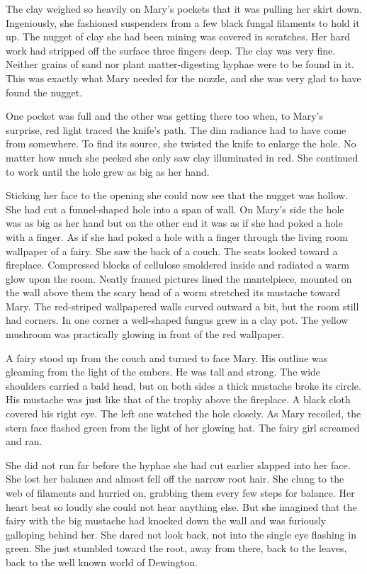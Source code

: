 \documentclass[10pt, draft]{memoir}
\begin{document}
The clay weighed so heavily on Mary's pockets that it was pulling her skirt down. Ingeniously, she fashioned suspenders from a few black fungal filaments to hold it up. The nugget of clay she had been mining was covered in scratches. Her hard work had stripped off the surface three fingers deep. The clay was very fine. Neither grains of sand nor plant matter-digesting hyphae were to be found in it. This was exactly what Mary needed for the nozzle, and she was very glad to have found the nugget.

One pocket was full and the other was getting there too when, to Mary's surprise, red light traced the knife's path. The dim radiance had to have come from somewhere. To find its source, she twisted the knife to enlarge the hole. No matter how much she peeked she only saw clay illuminated in red. She continued to work until the hole grew as big as her hand.

Sticking her face to the opening she could now see that the nugget was hollow. She had cut a funnel-shaped hole into a span of wall. On Mary's side the hole was as big as her hand but on the other end it was as if she had poked a hole with a finger. As if she had poked a hole with a finger through the living room wallpaper of a fairy. She saw the back of a couch. The seats looked toward a fireplace. Compressed blocks of cellulose smoldered inside and radiated a warm glow upon the room. Neatly framed pictures lined the mantelpiece, mounted on the wall above them the scary head of a worm stretched its mustache toward Mary. The red-striped wallpapered walls curved outward a bit, but the room still had corners. In one corner a well-shaped fungus grew in a clay pot. The yellow mushroom was practically glowing in front of the red wallpaper.

A fairy stood up from the couch and turned to face Mary. His outline was gleaming from the light of the embers. He was tall and strong. The wide shoulders carried a bald head, but on both sides a thick mustache broke its circle. His mustache was just like that of the trophy above the fireplace. A black cloth covered his right eye. The left one watched the hole closely. As Mary recoiled, the stern face flashed green from the light of her glowing hat. The fairy girl screamed and ran.

She did not run far before the hyphae she had cut earlier slapped into her face. She lost her balance and almost fell off the narrow root hair. She clung to the web of filaments and hurried on, grabbing them every few steps for balance. Her heart beat so loudly she could not hear anything else. But she imagined that the fairy with the big mustache had knocked down the wall and was furiously galloping behind her. She dared not look back, not into the single eye flashing in green. She just stumbled toward the root, away from there, back to the leaves, back to the well known world of Dewington.
\end{document}
